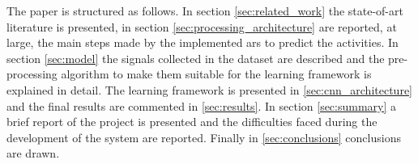 The paper is structured as follows. In section \ref{sec:related_work} the state-of-art literature is presented, in section \ref{sec:processing_architecture} are reported, at large, the main steps made by the implemented \gls{ars} to predict the activities.
In section \ref{sec:model} the signals collected in the dataset are described and the pre-processing algorithm to make them suitable for the learning framework is explained in detail.
The learning framework is presented in \ref{sec:cnn_architecture} and the final results are commented in \ref{sec:results}. 
In section \ref{sec:summary} a brief report of the project is presented and the difficulties faced during the development of the system are reported. Finally in \ref{sec:conclusions} conclusions are drawn.

